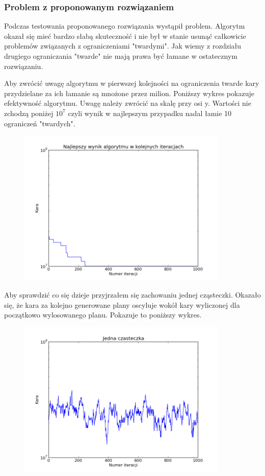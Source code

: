 \subsubsection{Problem z proponowanym rozwiązaniem}
\par Podczas testowania proponowanego rozwiązania wystąpił problem. Algorytm okazał się mieć bardzo słabą skuteczność i nie był w stanie usunąć całkowicie problemów związanych z ograniczeniami "twardymi". Jak wiemy z rozdziału drugiego ograniczania "twarde" nie mają prawa być łamane w ostatecznym rozwiązaniu. 
\par Aby zwrócić uwagę algorytmu w pierwszej kolejności na ograniczenia twarde kary przydzielane za ich łamanie są mnożone przez milion.
Poniższy wykres pokazuje efektywność algorytmu. Uwagę należy zwrócić na skalę przy osi y. Wartości nie zchodzą poniżej $10^{7}$ czyli wynik w najlepszym przypadku nadal łamie 10 ograniczeń "twardych".
\begin{figure}[H]
\includegraphics[width=10cm]{img/standard_penalty.png}
\centering
\end{figure}
\par Aby sprawdzić co się dzieje przyjrzałem się zachowaniu jednej cząsteczki. Okazało się, że kara za kolejno generowane plany oscyluje wokół kary wyliczonej dla początkowo wylosowanego planu. Pokazuje to poniższy wykres.  
\begin{figure}[H]
\includegraphics[width=10cm]{img/standard_particle.png}
\centering
\end{figure}
